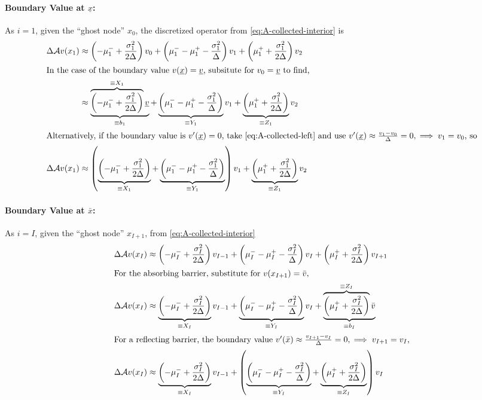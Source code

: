 \documentclass[11pt]{etk-article}
\begin{document}
\paragraph{Boundary Value at $\underline{x}$:}
As $i =1$, given the ``ghost node'' $x_0$, the discretized operator from \cref{eq:A-collected-interior} is
\begin{align}
\Delta \mathcal{A} v(x_1) &\approx \left(-\mu_1^{-} +\frac{\sigma_1^2}{2\Delta}\right)v_0 + \left(\mu_1^{-} - \mu_1^{+}-\frac{\sigma_1^2}{\Delta}\right)v_1 + \left(\mu_1^{+} + \frac{\sigma_1^2}{2\Delta}\right)v_2\label{eq:A-collected-left}\\
\intertext{In the case of the boundary value $v(\underline{x}) = \underline{v}$, subsitute for $v_0 =  \underline{v}$ to find,}
&\approx \underbrace{\overbrace{\left(-\mu_1^{-} +\frac{\sigma_1^2}{2\Delta}\right)}^{\equiv X_1}\underline{v}}_{\equiv b_1} +  \underbrace{\left(\mu_1^{-} - \mu_1^{+}-\frac{\sigma_1^2}{\Delta}\right)}_{\equiv Y_1}v_1 + \underbrace{\left(\mu_1^{+} + \frac{\sigma_1^2}{2\Delta}\right)}_{\equiv Z_1}v_2\\
\intertext{Alternatively, if the boundary value is $v'(\underline{x}) = 0$, take \cref{eq:A-collected-left} and use $v'(\underline{x}) \approx \frac{v_1-v_0}{\Delta} = 0, \implies v_1 = v_0$, so}
\Delta \mathcal{A} v(x_1) &\approx \left(\underbrace{\left(-\mu_1^{-} +\frac{\sigma_1^2}{2\Delta}\right)}_{\equiv X_1} + \underbrace{\left(\mu_1^{-} - \mu_1^{+}-\frac{\sigma_1^2}{\Delta}\right)}_{\equiv Y_1}\right)v_1 + \underbrace{\left(\mu_1^{+} + \frac{\sigma_1^2}{2\Delta}\right)}_{\equiv Z_1}v_2
\end{align}

\paragraph{Boundary Value at $\bar{x}$:}
As $i=I$, given the ``ghost node'' $x_{I+1}$, from \cref{eq:A-collected-interior}
\begin{align}
\Delta \mathcal{A} v(x_I)&\approx \left(-\mu_I^{-} +\frac{\sigma_I^2}{2\Delta}\right)v_{I-1} + \left(\mu_I^{-} - \mu_I^{+}-\frac{\sigma_I^2}{\Delta}\right)v_I + \left(\mu_I^{+} + \frac{\sigma_I^2}{2\Delta}\right)v_{I+1}\\
\intertext{For the absorbing barrier, substitute for $v(x_{I+1}) = \bar{v}$,}
\Delta \mathcal{A} v(x_I)&\approx \underbrace{\left(-\mu_I^{-} +\frac{\sigma_I^2}{2\Delta}\right)}_{\equiv X_I} v_{I-1} + \underbrace{\left(\mu_I^{-} - \mu_I^{+}-\frac{\sigma_I^2}{\Delta}\right)}_{\equiv Y_I} v_I + \underbrace{\overbrace{\left(\mu_I^{+} + \frac{\sigma_I^2}{2\Delta}\right)}^{\equiv Z_I}\bar{v}}_{\equiv b_I}\\
\intertext{For a reflecting barrier, the boundary value $v'(\bar{x}) \approx \frac{v_{I+1}-v_I}{\Delta} = 0, \implies v_{I+1} = v_I$,}
\Delta \mathcal{A} v(x_I)&\approx \underbrace{\left(-\mu_I^{-} +\frac{\sigma_I^2}{2\Delta}\right)}_{\equiv X_I} v_{I-1} + \left(\underbrace{\left(\mu_I^{-} - \mu_I^{+}-\frac{\sigma_I^2}{\Delta}\right)}_{\equiv Y_I} + \underbrace{\left(\mu_I^{+} + \frac{\sigma_I^2}{2\Delta}\right)}_{\equiv Z_I} \right) v_I 
\end{align}
\end{document}
